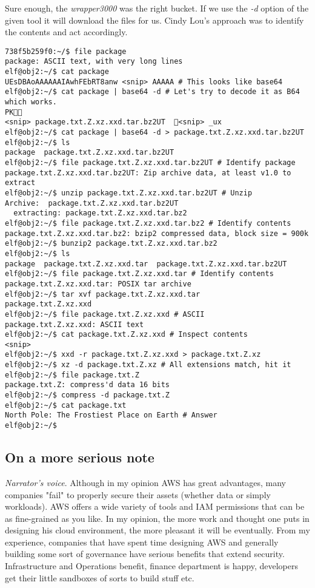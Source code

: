 Sure enough, the \textit{wrapper3000} was the right bucket.
If we use the \textit{-d} option of the given tool it will download the files for us.
Cindy Lou's approach was to identify the contents and act accordingly.
\begin{verbatim}
738f5b259f0:~/$ file package
package: ASCII text, with very long lines
elf@obj2:~/$ cat package
UEsDBAoAAAAAAIAwhFEbRT8anw <snip> AAAAA # This looks like base64
elf@obj2:~/$ cat package | base64 -d # Let's try to decode it as B64 which works.
PK
<snip> package.txt.Z.xz.xxd.tar.bz2UT  <snip> _ux
elf@obj2:~/$ cat package | base64 -d > package.txt.Z.xz.xxd.tar.bz2UT
elf@obj2:~/$ ls
package  package.txt.Z.xz.xxd.tar.bz2UT
elf@obj2:~/$ file package.txt.Z.xz.xxd.tar.bz2UT # Identify package
package.txt.Z.xz.xxd.tar.bz2UT: Zip archive data, at least v1.0 to extract
elf@obj2:~/$ unzip package.txt.Z.xz.xxd.tar.bz2UT # Unzip
Archive:  package.txt.Z.xz.xxd.tar.bz2UT
  extracting: package.txt.Z.xz.xxd.tar.bz2
elf@obj2:~/$ file package.txt.Z.xz.xxd.tar.bz2 # Identify contents
package.txt.Z.xz.xxd.tar.bz2: bzip2 compressed data, block size = 900k
elf@obj2:~/$ bunzip2 package.txt.Z.xz.xxd.tar.bz2
elf@obj2:~/$ ls
package  package.txt.Z.xz.xxd.tar  package.txt.Z.xz.xxd.tar.bz2UT
elf@obj2:~/$ file package.txt.Z.xz.xxd.tar # Identify contents
package.txt.Z.xz.xxd.tar: POSIX tar archive
elf@obj2:~/$ tar xvf package.txt.Z.xz.xxd.tar
package.txt.Z.xz.xxd
elf@obj2:~/$ file package.txt.Z.xz.xxd # ASCII
package.txt.Z.xz.xxd: ASCII text
elf@obj2:~/$ cat package.txt.Z.xz.xxd # Inspect contents
<snip>
elf@obj2:~/$ xxd -r package.txt.Z.xz.xxd > package.txt.Z.xz
elf@obj2:~/$ xz -d package.txt.Z.xz # All extensions match, hit it
elf@obj2:~/$ file package.txt.Z
package.txt.Z: compress'd data 16 bits
elf@obj2:~/$ compress -d package.txt.Z
elf@obj2:~/$ cat package.txt
North Pole: The Frostiest Place on Earth # Answer
elf@obj2:~/$
\end{verbatim}

\subsection {On a more serious note}
\textit{Narrator's voice}. Although in my opinion AWS has great advantages, many companies "fail" to properly secure their assets (whether data or simply workloads).
AWS offers a wide variety of tools and IAM permissions that can be as fine-grained as you like. In my opinion, the more work and thought one puts in designing his cloud environment, the more pleasant it will be eventually.
From my experience, companies that have spent time designing AWS and generally building some sort of governance have serious benefits that extend security.
Infrastructure and Operations benefit, finance department is happy, developers get their little sandboxes of sorts to build stuff etc.

